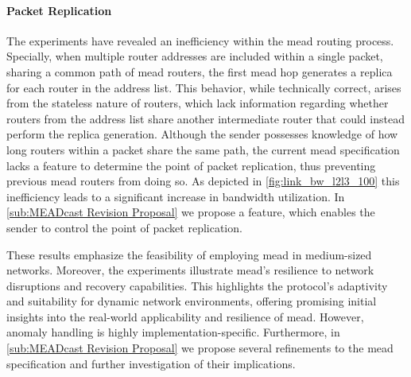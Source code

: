 \begin{itemize}
    \paragraph{Packet Replication} %
    \label{par:Discussion Packet Replication}
    The experiments have revealed an inefficiency within the \gls{mead} routing
        process.
    Specially, when multiple router addresses are included within a single
        packet, sharing a common path of \gls{mead} routers, the first \gls{mead}
        hop generates a replica for each router in the address list.
    This behavior, while technically correct, arises from the stateless nature
        of routers, which lack information regarding whether routers from the
        address list share another intermediate router that could instead
        perform the replica generation.
    Although the sender possesses knowledge of how long routers within a packet
        share the same path, the current \gls{mead} specification lacks a feature
        to determine the point of packet replication, thus preventing previous
        \gls{mead} routers from doing so.
    As depicted in \autoref{fig:link_bw_l2l3_100} this inefficiency leads to a
        significant increase in bandwidth utilization.
    In \autoref{sub:MEADcast Revision Proposal} we propose a feature, which
        enables the sender to control the point of packet replication.

    These results emphasize the feasibility of employing \gls{mead} in
        medium-sized networks.
    Moreover, the experiments illustrate \gls{mead}'s resilience to network
        disruptions and recovery capabilities.
    This highlights the protocol's adaptivity and suitability for dynamic
        network environments, offering promising initial insights into the
        real-world applicability and resilience of \gls{mead}.
    However, anomaly handling is highly implementation-specific.
    Furthermore, in \autoref{sub:MEADcast Revision Proposal} we propose several
        refinements to the \gls{mead} specification and further investigation of
        their implications.
\end{itemize}

